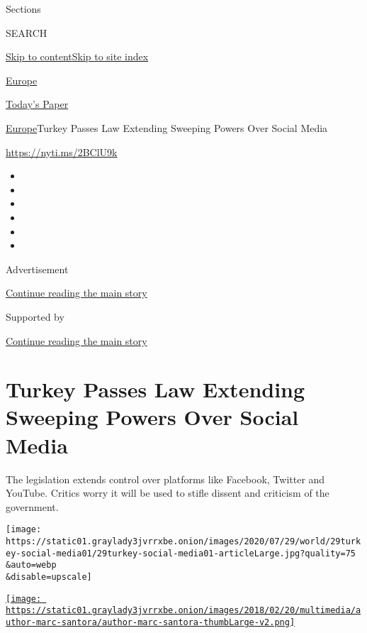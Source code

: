 Sections

SEARCH

\protect\hyperlink{site-content}{Skip to
content}\protect\hyperlink{site-index}{Skip to site index}

\href{https://www.nytimes3xbfgragh.onion/section/world/europe}{Europe}

\href{https://myaccount.nytimes3xbfgragh.onion/auth/login?response_type=cookie\&client_id=vi}{}

\href{https://www.nytimes3xbfgragh.onion/section/todayspaper}{Today's
Paper}

\href{/section/world/europe}{Europe}\textbar{}Turkey Passes Law
Extending Sweeping Powers Over Social Media

\href{https://nyti.ms/2BClU9k}{https://nyti.ms/2BClU9k}

\begin{itemize}
\item
\item
\item
\item
\item
\item
\end{itemize}

Advertisement

\protect\hyperlink{after-top}{Continue reading the main story}

Supported by

\protect\hyperlink{after-sponsor}{Continue reading the main story}

\hypertarget{turkey-passes-law-extending-sweeping-powers-over-social-media}{%
\section{Turkey Passes Law Extending Sweeping Powers Over Social
Media}\label{turkey-passes-law-extending-sweeping-powers-over-social-media}}

The legislation extends control over platforms like Facebook, Twitter
and YouTube. Critics worry it will be used to stifle dissent and
criticism of the government.

\texttt{[image: https://static01.graylady3jvrrxbe.onion/images/2020/07/29/world/29turkey-social-media01/29turkey-social-media01-articleLarge.jpg?quality=75\\\&auto=webp\\\&disable=upscale]}

\href{https://www.nytimes3xbfgragh.onion/by/marc-santora}{\texttt{[image: https://static01.graylady3jvrrxbe.onion/images/2018/02/20/multimedia/author-marc-santora/author-marc-santora-thumbLarge-v2.png]}}

